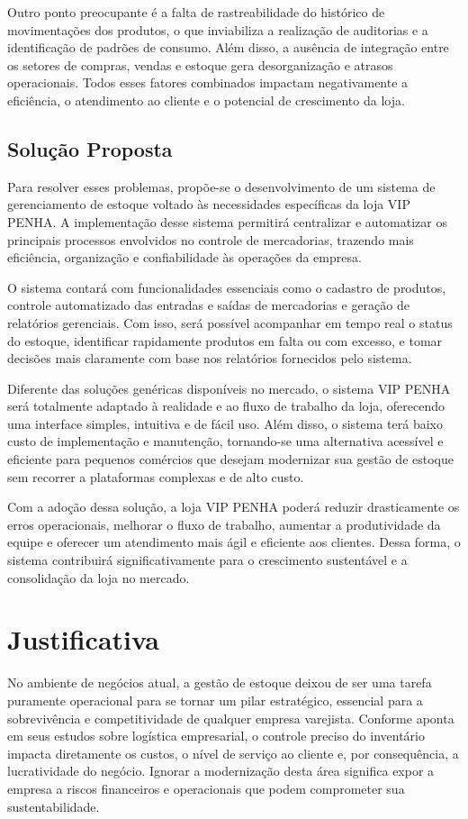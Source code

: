 \documentclass[
	12pt,				%
	openany,			%
	twoside,			%
	a4paper,			%
	english,			%
	brazil				%
	]{abntex2}
\begin{document}
Outro ponto preocupante é a falta de rastreabilidade do histórico de movimentações dos produtos, o que inviabiliza a realização de auditorias e a identificação de padrões de consumo. Além disso, a ausência de integração entre os setores de compras, vendas e estoque gera desorganização e atrasos operacionais. Todos esses fatores combinados impactam negativamente a eficiência, o atendimento ao cliente e o potencial de crescimento da loja.


\subsection{Solução Proposta}

Para resolver esses problemas, propõe-se o desenvolvimento de um sistema de gerenciamento de estoque voltado às necessidades específicas da loja VIP PENHA. A implementação desse sistema permitirá centralizar e automatizar os principais processos envolvidos no controle de mercadorias, trazendo mais eficiência, organização e confiabilidade às operações da empresa.

O sistema contará com funcionalidades essenciais como o cadastro de produtos, controle automatizado das entradas e saídas de mercadorias e geração de relatórios gerenciais. Com isso, será possível acompanhar em tempo real o status do estoque, identificar rapidamente produtos em falta ou com excesso, e tomar decisões mais claramente com base nos relatórios fornecidos pelo sistema.

Diferente das soluções genéricas disponíveis no mercado, o sistema VIP PENHA será totalmente adaptado à realidade e ao fluxo de trabalho da loja, oferecendo uma interface simples, intuitiva e de fácil uso. Além disso, o sistema terá baixo custo de implementação e manutenção, tornando-se uma alternativa acessível e eficiente para pequenos comércios que desejam modernizar sua gestão de estoque sem recorrer a plataformas complexas e de alto custo.

Com a adoção dessa solução, a loja VIP PENHA poderá reduzir drasticamente os erros operacionais, melhorar o fluxo de trabalho, aumentar a produtividade da equipe e oferecer um atendimento mais ágil e eficiente aos clientes. Dessa forma, o sistema contribuirá significativamente para o crescimento sustentável e a consolidação da loja no mercado.
 

\section{Justificativa}
No ambiente de negócios atual, a gestão de estoque deixou de ser uma tarefa puramente operacional para se tornar um pilar estratégico, essencial para a sobrevivência e competitividade de qualquer empresa varejista. Conforme aponta  em seus estudos sobre logística empresarial, o controle preciso do inventário impacta diretamente os custos, o nível de serviço ao cliente e, por consequência, a lucratividade do negócio. Ignorar a modernização desta área significa expor a empresa a riscos financeiros e operacionais que podem comprometer sua sustentabilidade.
\end{document}
